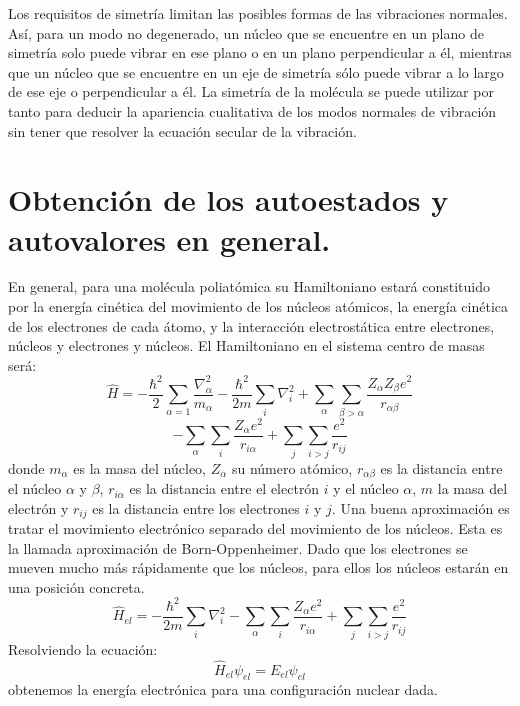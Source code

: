 \documentclass[a4paper]{article}
\begin{document}
Los requisitos de simetría limitan las posibles formas de las vibraciones normales. Así, para un modo no degenerado, un núcleo que se encuentre en un plano de simetría solo puede vibrar en ese plano o en un plano perpendicular a él, mientras que un núcleo que se encuentre en un eje de simetría sólo puede vibrar a lo largo de ese eje o perpendicular a él. La simetría de la molécula se puede utilizar por tanto para deducir la apariencia cualitativa de los modos normales de vibración sin tener que resolver la ecuación secular de la vibración.
\section{Obtención de los autoestados y autovalores en general.}
En general, para una molécula poliatómica su Hamiltoniano estará constituido por la energía cinética del movimiento de los núcleos atómicos, la energía cinética de los electrones de cada átomo, y la interacción electrostática entre electrones, núcleos y electrones y núcleos. El Hamiltoniano en el sistema centro de masas será:
$$
\hat H = -\frac{\hbar^2}{2}\sum_{\alpha=1}\frac{\nabla_\alpha^2}{m_\alpha}-\frac{\hbar^2}{2m}\sum_{i}\nabla_i^2+\sum_\alpha\sum_{\beta >\alpha}\frac{Z_\alpha Z_\beta e^2}{r_{\alpha \beta}}
$$
\begin{equation}
-\sum_\alpha\sum_i\frac{Z_\alpha e^2}{r_{i\alpha}}+\sum_j\sum_{i>j}\frac{e^2}{r_{ij}}
\end{equation}
donde $m_\alpha$ es la masa del núcleo, $Z_\alpha$ su número atómico, $r_{\alpha\beta}$ es la distancia entre el núcleo $\alpha$ y $\beta$, $r_{i\alpha}$ es la distancia entre el electrón $i$ y el núcleo $\alpha$, $m$ la masa del electrón y $r_{ij}$ es la distancia entre los electrones $i$ y $j$. 
Una buena aproximación es tratar el movimiento electrónico separado del movimiento de los núcleos. Esta es la llamada aproximación de Born-Oppenheimer. Dado que los electrones se mueven mucho más rápidamente que los núcleos, para ellos los núcleos estarán en una posición concreta. 
\begin{equation}
\hat H_{el} = -\frac{\hbar^2}{2m}\sum_{i}\nabla_i^2-\sum_\alpha\sum_i\frac{Z_\alpha e^2}{r_{i\alpha}}+\sum_j\sum_{i>j}\frac{e^2}{r_{ij}}
\end{equation}
Resolviendo la ecuación:
\begin{equation}
\hat H_{el}\psi_{el}=E_{el}\psi_{el}
\end{equation}
obtenemos la energía electrónica para una configuración nuclear dada.
\end{document}
